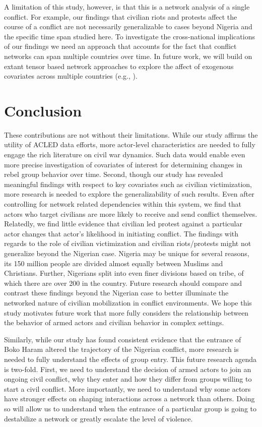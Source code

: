 A limitation of this study, however, is that this is a network analysis of a single conflict. For example, our findings that civilian riots and protests affect the course of a conflict are not necessarily generalizable to cases beyond Nigeria and the specific time span studied here. To investigate the cross-national implications of our findings we need an approach that accounts for the fact that conflict networks can span multiple countries over time. In future work, we will build on extant tensor based network approaches to explore the affect of exogenous covariates across multiple countries (e.g., \citealp{boccaletti:etal:2014,schein:etal:2015,minhas:etal:2016}). 

\section*{Conclusion}

These contributions are not without their limitations. While our study affirms the utility of ACLED data efforts, more actor-level characteristics are needed to fully engage the rich literature on civil war dynamics. Such data would enable even more precise investigation of covariates of interest for determining changes in rebel group behavior over time. Second, though our study has revealed meaningful findings with respect to key covariates such as civilian victimization, more research is needed to explore the generalizability of such results. Even after controlling for network related dependencies within this system, we find that actors who target civilians are more likely to receive and send conflict themselves. Relatedly, we find little evidence that civilian led protest against a particular actor changes that actor's likelihood in initiating conflict.  The findings with regards to the role of civilian victimization and civilian riots/protests might not generalize beyond the Nigerian case. Nigeria may be unique for several reasons, its 150 million people are divided almost equally between Muslims and Christians. Further, Nigerians split into even finer divisions based on tribe, of which there are over 200 in the country. Future research should compare and contrast these findings beyond the Nigerian case to better illuminate the networked nature of civilian mobilization in conflict environments.  We hope this study motivates future work that more fully considers the relationship between the behavior of armed actors and civilian behavior in complex settings.

Similarly, while our study has found consistent evidence that the entrance of Boko Haram altered the trajectory of the Nigerian conflict, more research is needed to fully understand the effects of group entry. This future research agenda is two-fold. First, we need to understand the decision of armed actors to join an ongoing civil conflict, why they enter and how they differ from groups willing to start a civil conflict. More importantly, we need to understand why some actors have stronger effects on shaping interactions across a network than others. Doing so will allow us to understand when the entrance of a particular group is going to destabilize a network or greatly escalate the level of violence. 

